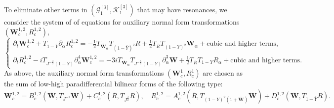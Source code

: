 \documentclass[10pt]{amsart}
\theoremstyle{remark}
\theoremstyle{definition}
\numberwithin{equation}{section}
\newcommand{\p}{\partial}
\newcommand{\al}{\alpha}
\newcommand{\f}{\frac}
\newcommand{\bw}{\mathbf{W}}
\begin{document}
To eliminate other terms in $(\mathcal{G}_1^{[3]}, \mathcal{K}_1^{[3]})$ that may have resonances, we consider the system of of equations for auxiliary normal form transformations $(\bw^{1,2}_c, R^{1,2}_c)$,
\begin{equation*}  
\begin{cases}
\p_t \bw^{1,2}_c+T_{1-\bar{Y}}\p_\al R^{1,2}_c=  -\f12 T_{\bar{\bw}_\al}T_{(1-\bar{Y})^2}R+ \f12  T_{\bar{R}} T_{(1-Y)^2}\bw_\al + \text{cubic and higher terms},\\
\p_t R^{1,2}_c-iT_{J^{-\f32}(1-Y)}\p_\al^4\bw^{1,2}_c= -3i  T_{\bar{\bw}_\al} T_{J^{-\f52}(1-Y)}  \p_\al^3 \bw  + \f12  T_{\bar{R}} T_{1-Y}R_\al  + \text{cubic and higher terms}.
\end{cases}
\end{equation*}
As above, the auxiliary normal form transformations $(\bw^1_c, R^1_c)$  are chosen as the sum of low-high paradifferential bilinear forms of the following type:
\begin{equation*} 
\bw^{1,2}_{c} = B^{1,2}_{c}\left(\bar{\bw}, T_{J^{-1}}\bw \right) + C^{1,2}_{c}\left(\bar{R}, T_{J^{\f32}}R \right),\quad R^{1,2}_{c} = A^{1,2}_{c} \left(\bar{R}, T_{(1-Y)^2(1+\bar{\bw})}\bw \right) + D^{1,2}_{c}\left(\bar{\bw}, T_{1-\bar{Y}}R\right).
\end{equation*}
\end{document}
